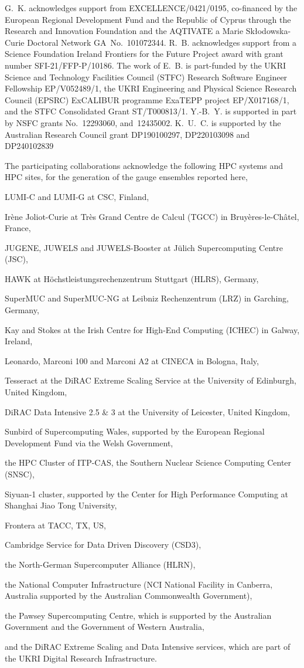 \documentclass[a4paper,11pt]{article}
\begin{document}
\acknowledgments G.~K. acknowledges support from EXCELLENCE/0421/0195,
co-financed by the European Regional Development Fund and the Republic
of Cyprus through the Research and Innovation Foundation and the
AQTIVATE a Marie Sk\l{}odowska-Curie Doctoral Network
GA~No.~101072344.  R.~B. acknowledges support from a Science
Foundation Ireland Frontiers for the Future Project award with grant
number SFI-21/FFP-P/10186. The work of E.~B. is part-funded by the
UKRI Science and Technology Facilities Council (STFC) Research
Software Engineer Fellowship EP/V052489/1, the UKRI Engineering and
Physical Science Research Council (EPSRC) ExCALIBUR programme ExaTEPP
project EP/X017168/1, and the STFC Consolidated Grant
ST/T000813/1. Y.-B.~Y. is supported in part by NSFC grants
No.~12293060, and~12435002. K.~U.~C. is supported by the Australian
Research Council grant DP190100297, DP220103098 and DP240102839


The participating collaborations acknowledge the following HPC systems
and HPC sites, for the generation of the gauge ensembles reported
here,\par LUMI-C and LUMI-G at CSC, Finland,\par Irène Joliot-Curie at
Très Grand Centre de Calcul (TGCC) in Bruyères-le-Châtel, France,\par
JUGENE, JUWELS and JUWELS-Booster at Jülich Supercomputing Centre
(JSC),\par HAWK at Höchstleistungsrechenzentrum Stuttgart (HLRS),
Germany,\par SuperMUC and SuperMUC-NG at Leibniz Rechenzentrum (LRZ)
in Garching, Germany,\par Kay and Stokes at the Irish Centre for
High-End Computing (ICHEC) in Galway, Ireland,\par Leonardo, Marconi
100 and Marconi A2 at CINECA in Bologna, Italy,\par Tesseract at the
DiRAC Extreme Scaling Service at the University of Edinburgh, United
Kingdom,\par DiRAC Data Intensive 2.5 \& 3 at the University of
Leicester, United Kingdom,\par Sunbird of Supercomputing Wales,
supported by the European Regional Development Fund via the Welsh
Government,\par the HPC Cluster of ITP-CAS, the Southern Nuclear
Science Computing Center (SNSC),\par Siyuan-1 cluster, supported by
the Center for High Performance Computing at Shanghai Jiao Tong
University, \par Frontera at TACC, TX, US,\par Cambridge Service for
Data Driven Discovery (CSD3),\par the North-German Supercomputer
Alliance (HLRN),\par the National Computer Infrastructure (NCI
National Facility in Canberra, Australia supported by the Australian
Commonwealth Government),\par the Pawsey Supercomputing Centre, which
is supported by the Australian Government and the Government of
Western Australia, \par and the DiRAC Extreme Scaling and Data
Intensive services, which are part of the UKRI Digital Research
Infrastructure.




\end{document}
